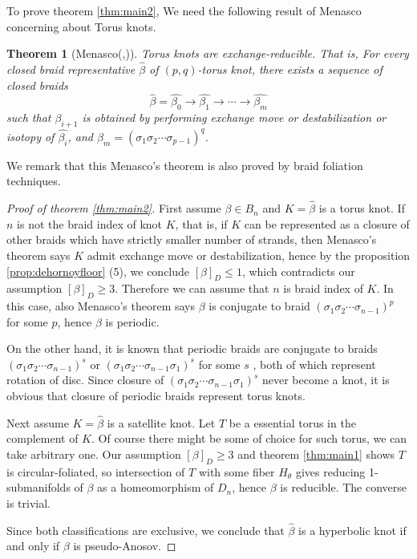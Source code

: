 \documentclass[12pt]{amsart}
\newtheorem{thm}{Theorem}
\begin{document}
 To prove theorem \ref{thm:main2}, We need the following result of Menasco concerning about Torus knots.
 
\begin{thm}[Menasco(\cite{me1},\cite{me2})]
   Torus knots are exchange-reducible. That is, For every closed braid representative $\widehat{\beta}$ of $(p,q)$-torus knot,
there exists a sequence of closed braids 
\[ \widehat{\beta}= \widehat{\beta_{0}}\rightarrow \widehat{\beta_{1}} \rightarrow \cdots \rightarrow \widehat{\beta_{m}} \] 
 such that $\widehat{{\beta}_{i+1}}$ is obtained by performing exchange move or destabilization or isotopy of $\widehat{\beta_{i}}$, and $\beta_{m} = (\sigma_{1}\sigma_{2}\cdots\sigma_{p-1})^q$. 
\end{thm}

  We remark that this Menasco's theorem is also proved by braid foliation techniques. 

\begin{proof}[Proof of theorem \ref{thm:main2}]

   First assume $\beta \in B_{n}$ and $K =\widehat{\beta}$ is a torus knot. If $n$ is not the braid index of knot $K$, that is, if $K$ can be represented as a closure of other braids which have strictly smaller number of strands, then Menasco's theorem says $K$ admit exchange move or destabilization, hence by the proposition \ref{prop:dehornoyfloor} (5), we conclude $[\beta]_{D}\leq 1$, which contradicts our assumption $[\beta]_{D} \geq 3 $.
 Therefore we can assume that $n$ is braid index of $K$. In this case, also Menasco's theorem says $\beta$ is conjugate to braid $(\sigma_{1}\sigma_{2}\cdots \sigma_{n-1})^{p}$ for some $p$, hence $\beta$ is periodic.

   On the other hand, it is known that periodic braids are conjugate to braids $(\sigma_{1}\sigma_{2}\cdots\sigma_{n-1})^{s}$ or $(\sigma_{1}\sigma_{2}\cdots\sigma_{n-1}\sigma_{1})^{s}$ for some $s$ , both of which represent rotation of disc. Since closure of $(\sigma_{1}\sigma_{2}\cdots\sigma_{n-1}\sigma_{1})^{s}$ never become a knot, it is obvious that closure of periodic braids represent torus knots.
 
   Next assume $K=\widehat{\beta}$ is a satellite knot. 
   Let $T$ be a essential torus in the complement of $K$. Of course there might be some of choice for such torus, we can take arbitrary one. Our assumption $[\beta]_{D} \geq 3$ and theorem \ref{thm:main1} shows $T$ is circular-foliated, so intersection of $T$ with some fiber $H_{\theta}$ gives reducing 1-submanifolds of $\beta$ as a homeomorphism of $D_{n}$, hence $\beta$ is reducible. The converse is trivial.


   Since both classifications are exclusive, we conclude that $\widehat{\beta}$ is a hyperbolic knot if and only if $\beta$ is pseudo-Anosov.

\end{proof}
\end{document}
